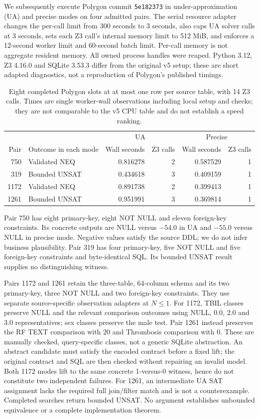 We subsequently execute Polygon commit \texttt{5e182373} in under-approximation (UA) and precise modes on four admitted pairs. The serial resource adapter changes the per-call limit from 300 seconds to 3 seconds, also caps UA solver calls at 3 seconds, sets each Z3 call's internal memory limit to 512 MiB, and enforces a 12-second worker limit and 60-second batch limit. Per-call memory is not aggregate resident memory. All owned process handles were reaped. Python 3.12, Z3 4.16.0 and SQLite 3.53.3 differ from the original v5 setup; these are short adapted diagnostics, not a reproduction of Polygon's published timings.

\begin{table}[htbp]
\centering\small
\begin{tabular}{r l rr rr}
\toprule
 & & \multicolumn{2}{c}{UA} & \multicolumn{2}{c}{Precise}\\
Pair & Outcome in each mode & Wall seconds & Z3 calls & Wall seconds & Z3 calls\\
\midrule
750 & Validated NEQ & 0.816278 & 2 & 0.587529 & 1\\
319 & Bounded UNSAT & 0.434618 & 3 & 0.409159 & 1\\
1172 & Validated NEQ & 0.891738 & 2 & 0.399413 & 1\\
1261 & Bounded UNSAT & 0.951991 & 3 & 0.369814 & 1\\
\bottomrule
\end{tabular}
\caption{Eight completed Polygon slots at at most one row per source table, with 14 Z3 calls. Times are single worker-wall observations including local setup and checks; they are not comparable to the v5 CPU table and do not establish a speed ranking.}\label{tab:polygon}
\end{table}

Pair 750 has eight primary-key, eight NOT NULL and eleven foreign-key constraints. Its concrete outputs are NULL versus $-54.0$ in UA and $-55.0$ versus NULL in precise mode. Negative values satisfy the source DDL; we do not infer business plausibility. Pair 319 has four primary-key, five NOT NULL and five foreign-key constraints and byte-identical SQL. Its bounded UNSAT result supplies no distinguishing witness.

Pairs 1172 and 1261 retain the three-table, 64-column schema and its two primary-key, three NOT NULL and two foreign-key constraints. They use separate source-specific observation adapters at $N\le1$. For 1172, TBIL classes preserve NULL and the relevant comparison outcomes using NULL, 0.0, 2.0 and 3.0 representatives; sex classes preserve the male test. Pair 1261 instead preserves the RF TEXT comparison with 20 and Thrombosis comparison with 0. These are manually checked, query-specific classes, not a generic SQLite abstraction. An abstract candidate must satisfy the encoded contract before a fixed lift; the original contract and SQL are then checked without repairing an invalid model. Both 1172 modes lift to the same concrete 1-versus-0 witness, hence do not constitute two independent failures. For 1261, an intermediate UA SAT assignment lacks the required full join/filter match and is not a counterexample. Completed searches return bounded UNSAT. No argument establishes unbounded equivalence or a complete implementation theorem.

